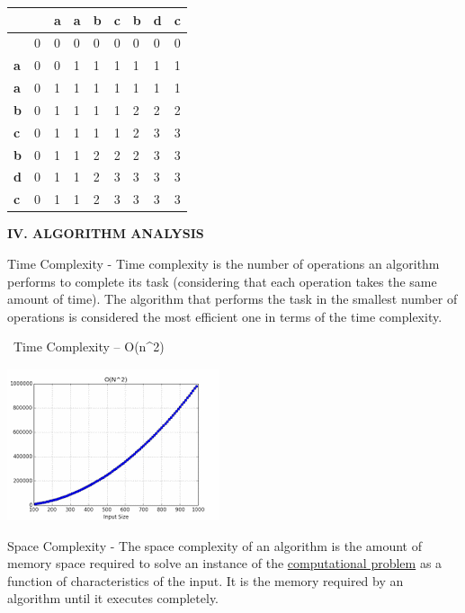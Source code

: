 \documentclass[letterpaper]{article}
\begin{document}
\begin{multicols}{2}
\begin{table}
\begin{tabular}{|m{0.68cm}|m{0.611cm}|m{0.68200004cm}|m{0.788cm}|m{0.68200004cm}|m{0.611cm}|m{0.53900003cm}|m{0.68200004cm}|m{0.544cm}|}
\hline
~
 &
~
 &
{\bfseries a} &
{\bfseries a} &
{\bfseries b} &
{\bfseries c} &
{\bfseries b} &
{\bfseries d} &
{\bfseries c}\\\hline
~
 &
0 &
0 &
0 &
0 &
0 &
0 &
0 &
0\\\hline
{\bfseries a} &
0 &
0 &
1 &
1 &
1 &
1 &
1 &
1\\\hline
{\bfseries a} &
0 &
1 &
1 &
1 &
1 &
1 &
1 &
1\\\hline
{\bfseries b} &
0 &
1 &
1 &
1 &
1 &
2 &
2 &
2\\\hline
{\bfseries c} &
0 &
1 &
1 &
1 &
1 &
2 &
3 &
3\\\hline
{\bfseries b} &
0 &
1 &
1 &
2 &
2 &
2 &
3 &
3\\\hline
{\bfseries d} &
0 &
1 &
1 &
2 &
3 &
3 &
3 &
3\\\hline
{\bfseries c} &
0 &
1 &
1 &
2 &
3 &
3 &
3 &
3\\\hline\end{tabular}

\end{table}

\bigskip

{\bfseries
IV. ALGORITHM ANALYSIS}


\bigskip

Time Complexity - Time complexity is the number of operations an algorithm performs to complete its task (considering
that each operation takes the same amount of time). The algorithm that performs the task in the smallest number of
operations is considered the most efficient one in terms of the time complexity.

\ Time Complexity -- O(n\^{}2)

\includegraphics[scale=1]{complexity}


\bigskip

Space Complexity - The space complexity of an algorithm is the amount of memory space required to solve an instance of
the \href{https://en.wikipedia.org/wiki/Computational_problem}{\textcolor[rgb]{0.06666667,0.33333334,0.8}{computational
problem}} as a function of characteristics of the input. It is the memory required by an algorithm until it executes
completely.


\end{multicols}
\end{document}

